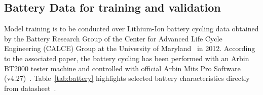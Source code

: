 \subsection{Battery Data for training and validation} \label{subsec:b_data}
%
Model training is to be conducted over Lithium-Ion battery cycling data obtained by the Battery Research Group of the Center for Advanced Life Cycle Engineering (CALCE) Group at the University of Maryland~\cite{noauthor_calce_2017} in 2012.
According to the associated paper, the battery cycling has been performed with an Arbin BT2000 tester machine and controlled with official Arbin Mits Pro Software (v4.27)~\cite{xing_state_2014}.
\mbox{Table~\ref{tab:battery}} highlights selected battery characteristics directly from datasheet~\cite{noauthor_anr26650m1a}.
\begin{table}[ht]
    \renewcommand{\arraystretch}{1.3}
    \caption{Battery characteristics}
    \centering
    \label{tab:battery}
\end{table}

